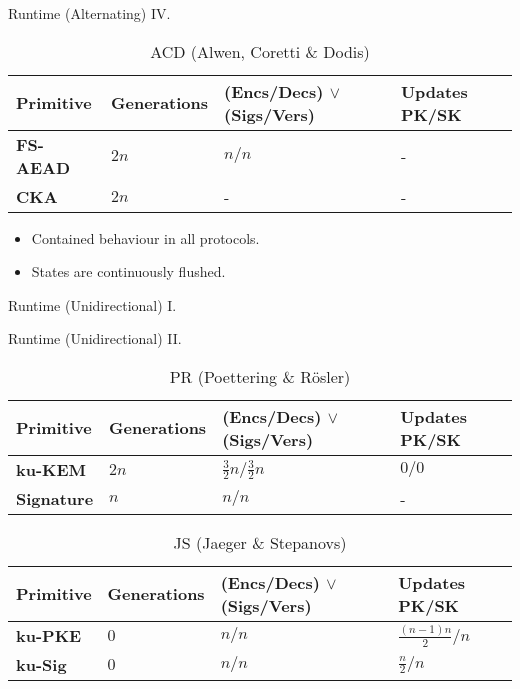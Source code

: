 \documentclass{beamer}
\begin{document}
\begin{frame}{Runtime (Alternating) IV.}
  \scriptsize
  \begin{table}
    \caption*{ACD (Alwen, Coretti \& Dodis)}
    \begin{tabular}{ | l | l | l | l |}
      \hline
      Primitive & Generations & (Encs/Decs) $\vee$ (Sigs/Vers) & Updates PK/SK \\ \hline
      \textbf{FS-AEAD} & $2n$ & $n/n$ & - \\ \hline
      \textbf{CKA} & $2n$ & - & - \\  
      \hline
    \end{tabular}
  \end{table}
  \normalsize
  \begin{itemize}
  \item Contained behaviour in all protocols.
  \item States are continuously flushed.
  \end{itemize}
\end{frame}

\begin{frame}{Runtime (Unidirectional) I.}
  \begin{figure}[H]
    \centering
     
  \end{figure}
\end{frame}

\begin{frame}{Runtime (Unidirectional) II.}
  \scriptsize
  \begin{table}
    \caption*{PR (Poettering \& Rösler)}
    \begin{tabular}{ | l | l | l | l |}
    \hline
    Primitive & Generations & (Encs/Decs) $\vee$ (Sigs/Vers) & Updates PK/SK \\ \hline
    \textbf{ku-KEM} & $2n$ & $\frac{3}{2}n/\frac{3}{2}n$ & $0/0$ \\ \hline
    \textbf{Signature} & $n$ & $n/n$ & - \\  
    \hline
    \end{tabular}
  \end{table}
  \begin{table}
    \caption*{JS (Jaeger \& Stepanovs)}
    \begin{tabular}{ | l | l | l | l |}
    \hline
    Primitive & Generations & (Encs/Decs) $\vee$ (Sigs/Vers) & Updates PK/SK \\ \hline
    \textbf{ku-PKE} & $0$ & $n/n$ & $\frac{(n-1)n}{2}/n$ \\ \hline
    \textbf{ku-Sig} & $0$ & $n/n$ & $\frac{n}{2}/n$ \\  
    \hline
    \end{tabular}
  \end{table}
\end{frame}
\end{document}
